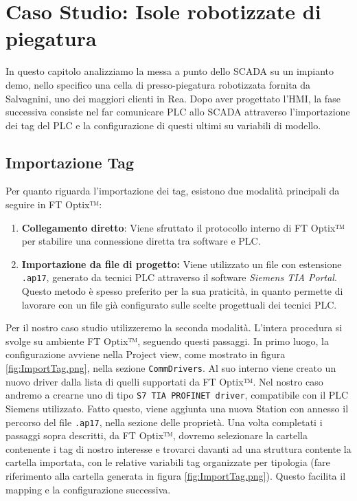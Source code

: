 \chapter{Caso Studio: Isole robotizzate di piegatura} \label{sec:CasoStudio}

In questo capitolo analizziamo la messa a punto dello SCADA su un impianto demo, nello specifico una cella di presso-piegatura robotizzata fornita da Salvagnini, uno dei maggiori clienti in Rea. Dopo aver progettato l'HMI, la fase successiva consiste nel far comunicare PLC allo SCADA attraverso l'importazione dei tag del PLC e la configurazione di questi ultimi su variabili di modello.

\section{Importazione Tag}
Per quanto riguarda l'importazione dei tag, esistono due modalità principali da seguire in FT Optix™:
\begin{enumerate}
    \item \textbf{Collegamento diretto}: Viene sfruttato il protocollo interno di FT Optix™ per stabilire una connessione diretta tra software e PLC.
    \item \textbf{Importazione da file di progetto:} Viene utilizzato un file con estensione \verb|.ap17|, generato da tecnici PLC attraverso il software \textit{Siemens TIA Portal}. Questo metodo è spesso preferito per la sua praticità, in quanto permette di lavorare con un file già configurato sulle scelte progettuali dei tecnici PLC.
\end{enumerate}
Per il nostro caso studio utilizzeremo la seconda modalità. L'intera procedura si svolge su ambiente FT Optix™, seguendo questi passaggi. In primo luogo, la configurazione avviene nella Project view, come mostrato in figura \ref{fig:ImportTag.png}, nella sezione \verb|CommDrivers|. Al suo interno viene creato un nuovo driver dalla lista di quelli supportati da FT Optix™. Nel nostro caso andremo a crearne uno di tipo \verb|S7 TIA PROFINET driver|, compatibile con il PLC Siemens utilizzato. Fatto questo, viene aggiunta una nuova Station con annesso il percorso del file \verb|.ap17|, nella sezione delle proprietà. Una volta completati i passaggi sopra descritti, da FT Optix™, dovremo selezionare la cartella contenente i tag di nostro interesse e trovarci davanti ad una struttura contente la cartella importata, con le relative variabili tag organizzate per tipologia (fare riferimento alla cartella generata in figura \ref{fig:ImportTag.png}). Questo facilita il mapping e la configurazione successiva.


